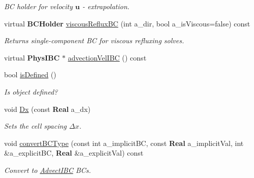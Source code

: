 \begin{DoxyCompactItemize}
\begin{DoxyCompactList}\small\item\em BC holder for velocity $ \mathbf{u} $ -\/ extrapolation. \end{DoxyCompactList}\item 
\mbox{\label{class_phys_b_c_util_a2e01aaaeff61fc14e7b15bade1d77303}} 
virtual \textbf{ B\+C\+Holder} \hyperlink{class_phys_b_c_util_a2e01aaaeff61fc14e7b15bade1d77303}{viscous\+Reflux\+BC} (int a\+\_\+dir, bool a\+\_\+is\+Viscous=false) const
\begin{DoxyCompactList}\small\item\em Returns single-\/component BC for viscous refluxing solves. \end{DoxyCompactList}\item 
virtual \textbf{ Phys\+I\+BC} $\ast$ \hyperlink{class_phys_b_c_util_a9837cec809ca2c0e61a631736fd97de8}{advection\+Vel\+I\+BC} () const
\item 
\mbox{\label{class_phys_b_c_util_afbc82bf7d509c99722005bbb202bd71e}} 
bool \hyperlink{class_phys_b_c_util_afbc82bf7d509c99722005bbb202bd71e}{is\+Defined} ()
\begin{DoxyCompactList}\small\item\em Is object defined? \end{DoxyCompactList}\item 
\mbox{\label{class_phys_b_c_util_a35dc4c0a9f1f3a7515c924d2de3dcaf7}} 
void \hyperlink{class_phys_b_c_util_a35dc4c0a9f1f3a7515c924d2de3dcaf7}{Dx} (const \textbf{ Real} a\+\_\+dx)
\begin{DoxyCompactList}\small\item\em Sets the cell spacing $ \Delta x $. \end{DoxyCompactList}\item 
\mbox{\label{class_phys_b_c_util_aea31c120a55a405ee18ed078bcc4d8d7}} 
void \hyperlink{class_phys_b_c_util_aea31c120a55a405ee18ed078bcc4d8d7}{convert\+B\+C\+Type} (const int a\+\_\+implicit\+BC, const \textbf{ Real} a\+\_\+implicit\+Val, int \&a\+\_\+explicit\+BC, \textbf{ Real} \&a\+\_\+explicit\+Val) const
\begin{DoxyCompactList}\small\item\em Convert to \hyperlink{class_advect_i_b_c}{Advect\+I\+BC} B\+Cs. \end{DoxyCompactList}\item 

\end{DoxyCompactItemize}
